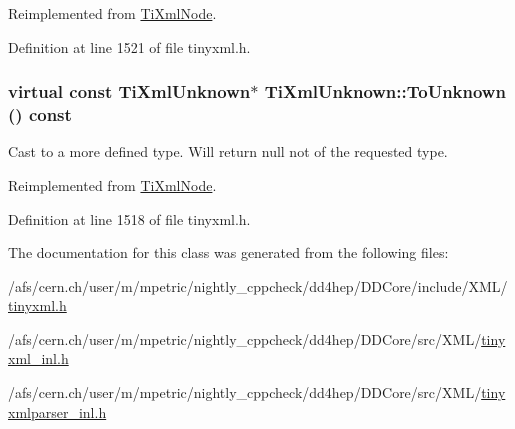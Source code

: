 Reimplemented from \hyperlink{class_ti_xml_node_a06de5af852668c7e4af0d09c205f0b0d}{TiXmlNode}.

Definition at line 1521 of file tinyxml.h.\hypertarget{class_ti_xml_unknown_ab0313e5fe77987d746ac1a97a254419d}{
\subsubsection[{ToUnknown}]{\setlength{\rightskip}{0pt plus 5cm}virtual const {\bf TiXmlUnknown}$\ast$ TiXmlUnknown::ToUnknown () const}}
\label{class_ti_xml_unknown_ab0313e5fe77987d746ac1a97a254419d}


Cast to a more defined type. Will return null not of the requested type. 

Reimplemented from \hyperlink{class_ti_xml_node_afd7205cf31d7a376929f8a36930627a2}{TiXmlNode}.

Definition at line 1518 of file tinyxml.h.

The documentation for this class was generated from the following files:\begin{DoxyCompactItemize}
\item 
/afs/cern.ch/user/m/mpetric/nightly\_\-cppcheck/dd4hep/DDCore/include/XML/\hyperlink{tinyxml_8h}{tinyxml.h}\item 
/afs/cern.ch/user/m/mpetric/nightly\_\-cppcheck/dd4hep/DDCore/src/XML/\hyperlink{tinyxml__inl_8h}{tinyxml\_\-inl.h}\item 
/afs/cern.ch/user/m/mpetric/nightly\_\-cppcheck/dd4hep/DDCore/src/XML/\hyperlink{tinyxmlparser__inl_8h}{tinyxmlparser\_\-inl.h}\end{DoxyCompactItemize}
